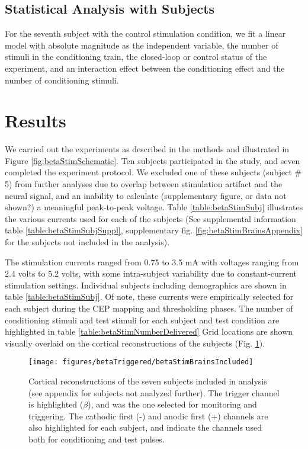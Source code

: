 \subsection{Statistical Analysis with Subjects}
For the seventh subject with the control stimulation condition, we fit a linear model with absolute magnitude as the independent variable, the number of stimuli in the conditioning train, the closed-loop or control status of the experiment, and an interaction effect between the conditioning effect and the number of conditioning stimuli.

\section{Results}
We carried out the experiments as described in the methods and illustrated in Figure \ref{fig:betaStimSchematic}. Ten subjects participated in the study, and seven completed the experiment protocol. We excluded one of these subjects (subject \# 5) from further analyses due to overlap between stimulation artifact and the neural signal, and an inability to calculate (supplementary figure, or data not shown?) a meaningful peak-to-peak voltage. Table \ref{table:betaStimSubj} illustrates the various currents used for each of the subjects (See supplemental information table \ref{table:betaStimSubjSuppl}, supplementary fig. \ref{fig:betaStimBrainsAppendix} for the subjects not included in the analysis). 

The stimulation currents ranged from 0.75 to 3.5 mA with voltages ranging from 2.4 volts to 5.2 volts, with some intra-subject variability due to constant-current stimulation settings. Individual subjects including demographics are shown in table \ref{table:betaStimSubj}. Of note, these currents were empirically selected for each subject during the CEP mapping and thresholding phases. The number of conditioning stimuli and test stimuli for each subject and test condition are highlighted in table \ref{table:betaStimNumberDelivered} Grid locations are shown visually overlaid on the cortical reconstructions of the subjects (Fig. \ref{fig:betaStimBrainsIncluded}). 

\begin{figure}[ht]
	\centering
	\texttt{[image: figures/betaTriggered/betaStimBrainsIncluded]}
	\caption[Subject cortical reconstructions]{Cortical reconstructions of the seven subjects included in analysis (see appendix for subjects not analyzed further). The trigger channel is highlighted ($\beta$), and was the one selected for monitoring and triggering. The cathodic first (-) and anodic first (+) channels are also highlighted for each subject, and indicate the channels used both for conditioning and test pulses.  
	}
	\label{fig:betaStimBrainsIncluded}
\end{figure}

